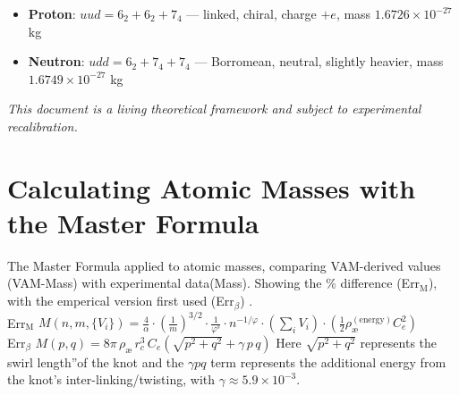 \documentclass[12pt]{article}
\begin{document}
\begin{itemize}
    \item \textbf{Proton}: \( uud = 6_2 + 6_2 + 7_4 \) — linked, chiral, charge \(+e\), mass \(1.6726 \times 10^{-27}\) kg
    \item \textbf{Neutron}: \( udd = 6_2 + 7_4 + 7_4 \) — Borromean, neutral, slightly heavier, mass \(1.6749 \times 10^{-27}\) kg
\end{itemize}

\vspace{0.5em}
\noindent
\textit{This document is a living theoretical framework and subject to experimental recalibration.}

      \appendix
      \section*{Calculating Atomic Masses with the Master Formula}
  The Master Formula applied to atomic masses, comparing VAM-derived values (VAM-Mass) with experimental data(Mass). Showing the \% difference (Err$_\text{M}$), with the emperical version first used (Err$_\beta$)  .   \\ Err$_\text{M}$ \( M(n, m, \{V_i\}) = \frac{4}{\alpha} \cdot \left( \frac{1}{m} \right)^{3/2} \cdot \frac{1}{\varphi^s} \cdot n^{-1/\varphi} \cdot \left( \sum_i V_i \right) \cdot \left( \frac{1}{2} \rho_\text{\ae}^{(\text{energy})} C_e^2 \right) \)\\
  Err$_\beta$ \(  M(p,q) = 8\pi\,\rho_{\text{\ae}}\,r_c^3\,C_e \left(\sqrt{p^2 + q^2} + \gamma\, p\,q\right) \)
  Here $\sqrt{p^2+q^2}$ represents the \grqq swirl length\textquotedblright of the knot and the $\gamma p q$ term represents the additional energy from the knot's inter-linking/twisting, with $\gamma \approx 5.9\times10^{-3}$.
\end{document}
